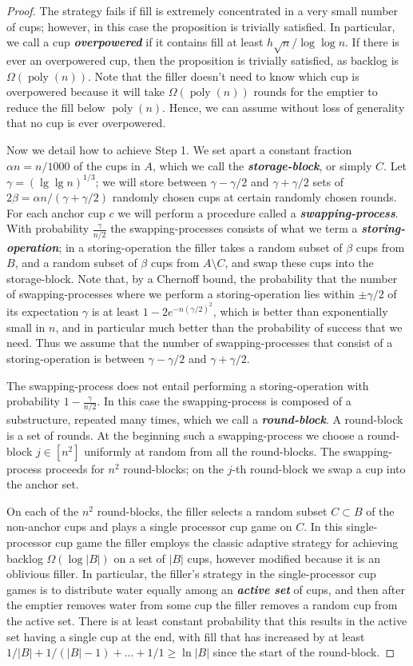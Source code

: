 \documentclass[twocolumn]{article}[10pt]
\newcommand{\defn}[1]{{\textit{\textbf{\boldmath #1}}}\xspace}
\DeclareMathOperator{\poly}{\text{poly}}
\begin{document}
\begin{proof}
{The strategy fails if fill is extremely concentrated in a very small number of
cups; however, in this case the proposition is trivially satisfied. In
particular, we call a cup \defn{overpowered} if it contains fill at least
$h\sqrt{n}/\log\log n$. If there is ever an overpowered cup, then the
proposition is trivially satisfied, as backlog is $\Omega(\poly(n))$. Note
that the filler doesn't need to know which cup is overpowered because it will take
$\Omega(\poly(n))$ rounds for the emptier to reduce the fill below $\poly(n)$.
Hence, we can assume without loss of generality that no cup is ever
overpowered. 

Now we detail how to achieve Step 1.
We set apart a constant fraction $\alpha n= n/1000$ of the cups in $A$, which
we call the \defn{storage-block}, or simply $C$. Let $\gamma = (\lg\lg
n)^{1/3}$; we will store between
$\gamma -\gamma/2$ and $\gamma + \gamma/2$ sets of $2\beta = \alpha n / (\gamma +
\gamma/2)$ randomly chosen cups at certain randomly chosen rounds.
For each anchor cup $c$ we will perform a procedure called a \defn{swapping-process}. 
With probability $\frac{\gamma}{n/2}$ the swapping-processes consists of what
we term a \defn{storing-operation}; in a storing-operation the filler takes a 
random subset of $\beta$ cups from $B$, and a random subset of $\beta$ cups
from $A \setminus C$, and swap these cups into the storage-block.
Note that, by a Chernoff bound, the probability that the number of
swapping-processes where we perform a storing-operation lies within $\pm
\gamma/2$ of its expectation $\gamma$ is at least $1-2e^{-n(\gamma/2)^2}$,
which is better than exponentially small in $n$, and in particular much
better than the probability of success that we need.
Thus we assume that the number of swapping-processes that consist of a
storing-operation is between $\gamma- \gamma/2$ and $\gamma+\gamma/2$.

The swapping-process does not entail performing a storing-operation with
probability $1-\frac{\gamma}{n/2}$. In this case the swapping-process is
composed of a substructure, repeated many times, which we call a
\defn{round-block}. A round-block is a set of rounds. At the beginning such a
swapping-process we choose a round-block $j \in [n^2]$ uniformly at random from
all the round-blocks. The swapping-process proceeds for $n^2$ round-blocks; on
the $j$-th round-block we swap a cup into the anchor set.

On each of the $n^2$ round-blocks, the filler selects a random subset $C\subset
B$ of the non-anchor cups and plays a single processor cup game on $C$. In this
single-processor cup game the filler employs the classic adaptive strategy for
achieving backlog $\Omega(\log |B|)$ on a set of $|B|$ cups, however modified
because it is an oblivious filler. In particular, the filler's strategy in the
single-processor cup games is to distribute water equally among an \defn{active
set} of cups, and then after the emptier removes water from some cup the filler
removes a random cup from the active set. There is at least constant
probability that this results in the active set having a single cup at the end,
with fill that has increased by at least $1/|B| + 1/(|B|-1) + \ldots + 1/1 \ge
\ln |B|$ since the start of the round-block.

}
\end{proof}
\end{document}
